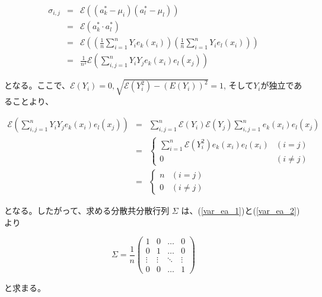 \documentclass[a4paper,xelatex,ja=standard,jafont=hiragino-pron]{bxjsarticle}
\begin{document}
\begin{eqnarray}
  \sigma_{i, j}
    &=& \mathscr{E}
      \left(
        \left(a^*_k - \mu_i\right)
        \left(a^*_l - \mu_l\right)
      \right) \nonumber \\
    &=& \mathscr{E}\left(a^*_k \cdot a^*_l \right) \nonumber \\
    &=& \mathscr{E}
      \left(
        \left(\frac{1}{n} \sum_{i = 1}^n Y_i e_k (x_i)\right)
        \left(\frac{1}{n} \sum_{i = 1}^n Y_i e_l (x_i)\right)
      \right) \nonumber \\
    &=& \frac{1}{n^2} \mathscr{E}
      \left(
        \sum_{i, j = 1}^n Y_i Y_j e_k(x_i) e_l(x_j)
      \right) \label{var_ea_1}
\end{eqnarray}

となる。ここで、$\mathscr{E}(Y_i) = 0, \sqrt{\mathscr{E}(Y_i^2) - (E(Y_i))^2} = 1$, そして$Y_i$が独立であることより、

\begin{eqnarray}
  \mathscr{E}\left(
    \sum_{i, j = 1}^n Y_i Y_j e_k(x_i) e_l(x_j)
  \right)
    &=& \sum_{i, j = 1}^n \mathscr{E}(Y_i)\mathscr{E}(Y_j) \sum_{i, j = 1}^n e_k(x_i) e_l(x_j) \nonumber \\
    &=& \begin{cases}
      \sum_{i = 1}^n \mathscr{E}\left(Y_i^2\right)e_k(x_i) e_l(x_i) & (i = j) \\
      0  & (i \neq j)
    \end{cases} \nonumber \\
    &=& \begin{cases}
      n & (i = j) \\
      0 & (i \neq j)
    \end{cases} \label{var_ea_2}
\end{eqnarray}

となる。したがって、求める分散共分散行列 $\Sigma$ は、(\ref{var_ea_1})と(\ref{var_ea_2})より

\begin{equation}
  \Sigma = \frac{1}{n}\left(
    \begin{array}{cccc}
      1 & 0 & \ldots & 0 \\
      0 & 1 & \ldots & 0 \\
      \vdots & \vdots & \ddots & \vdots \\
      0 & 0 & \ldots & 1
    \end{array}
  \right)
\end{equation}

と求まる。
\end{document}
